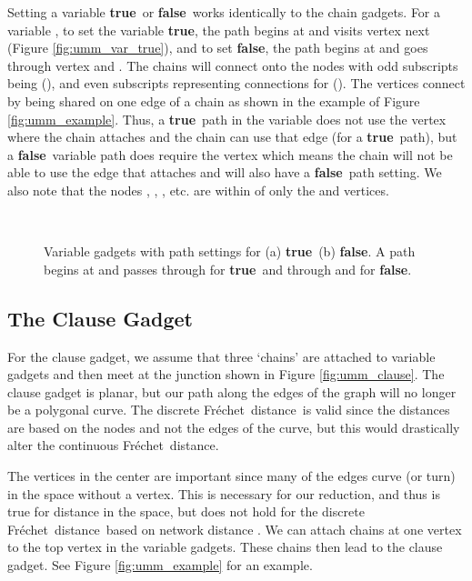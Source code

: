 \documentclass{article}[11pt]
\newcommand{\frechet}{Fr\'echet}
\newcommand{\dfd}{discrete \frechet\ distance}
\newcommand{\true}{\textbf{true}}
\newcommand{\false}{\textbf{false}}
\begin{document}
Setting a variable \true\ or \false\ works identically to the chain gadgets. 
For a variable , to set the variable \true, the path begins at  and 
visits vertex  next (Figure \ref{fig:umm_var_true}), and to set 
\false, the path begins at  and goes through vertex  and
.  The chains will connect onto the  nodes with odd subscripts 
being  (), and even subscripts representing connections
for  ().  The  vertices connect by being
shared on one edge of a chain as shown in the example of Figure \ref{fig:umm_example}.
Thus, a \true\ path in the variable does not use the  vertex where the chain attaches
and the chain can use that edge (for a \true\ path), but
a \false\ variable path does require the vertex  which means the chain will not be able to
use the edge that attaches and will also have a \false\ path setting.
We also note that the nodes , , , etc. are within  of 
only the  and  vertices.



\begin{figure}[ht!]
\begin{center}
        \hspace*{.5cm}
         \\
\end{center}
\caption{Variable gadgets with path settings for (a) \true\ (b) \false. A path begins at  and 
        passes through  for \true\ and through  and  for \false.}
    \label{fig:umm_var}
\end{figure} 




\subsection{The Clause Gadget}
For the clause gadget, we assume that three `chains' are attached to variable gadgets
and then meet at the junction shown in Figure \ref{fig:umm_clause}. The clause gadget is
planar, but our path along the edges of the graph will no longer be a polygonal curve. 
The \dfd\ is valid since the distances are based on the nodes and not the edges
of the curve, but this would drastically alter the continuous \frechet\ distance.

The vertices in the center are important since many of the edges curve (or turn) in the
space without a vertex.  This is necessary for our reduction, and thus is true
for distance in the space, but does not hold for the \dfd\ based on network
distance \cite{Fan:2011:CGGA}.
We can attach chains at one vertex to the top vertex in the variable gadgets.
These chains then lead to the clause gadget.  See Figure \ref{fig:umm_example}
for an example.
\end{document}
